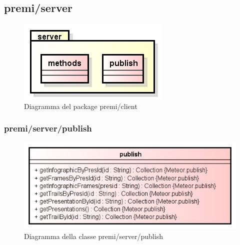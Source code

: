 \clearpage
\subsection{premi/server}
\begin{figure}[H]
\begin{center}
\includegraphics[scale=0.90]{img/diapkg/server.png}
\caption{Diagramma del package premi/client}
\end{center}
\end{figure}


\subsubsection{premi/server/publish}
\begin{figure}[H]
\begin{center}
\includegraphics[scale=0.85]{img/diacla/publish.png}
\caption{Diagramma della classe premi/server/publish}
\end{center}
\end{figure}




